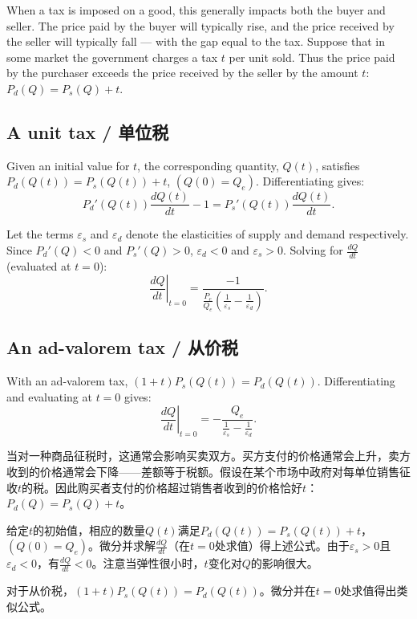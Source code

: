 \begin{original}
When a tax is imposed on a good, this generally impacts both the buyer and seller. The price paid by the buyer will typically rise, and the price received by the seller will typically fall --- with the gap equal to the tax. Suppose that in some market the government charges a tax $t$ per unit sold. Thus the price paid by the purchaser exceeds the price received by the seller by the amount $t$: $P_d(Q) = P_s(Q) + t$.

\subsection{A unit tax / 单位税}

Given an initial value for $t$, the corresponding quantity, $Q(t)$, satisfies $P_d(Q(t)) = P_s(Q(t)) + t$, $(Q(0) = Q_e)$. Differentiating gives:
\[
P_d'(Q(t))\frac{dQ(t)}{dt} - 1 = P_s'(Q(t))\frac{dQ(t)}{dt}.
\]

Let the terms $\varepsilon_s$ and $\varepsilon_d$ denote the elasticities of supply and demand respectively. Since $P_d'(Q) < 0$ and $P_s'(Q) > 0$, $\varepsilon_d < 0$ and $\varepsilon_s > 0$. Solving for $\frac{dQ}{dt}$ (evaluated at $t = 0$):
\[
\left.\frac{dQ}{dt}\right|_{t=0} = \frac{-1}{\frac{P_e}{Q_e}\left(\frac{1}{\varepsilon_s} - \frac{1}{\varepsilon_d}\right)}.
\]

\subsection{An ad-valorem tax / 从价税}

With an ad-valorem tax, $(1 + t)P_s(Q(t)) = P_d(Q(t))$. Differentiating and evaluating at $t = 0$ gives:
\[
\left.\frac{dQ}{dt}\right|_{t=0} = -\frac{Q_e}{\frac{1}{\varepsilon_s} - \frac{1}{\varepsilon_d}}.
\]
\end{original}
\begin{translation}
当对一种商品征税时，这通常会影响买卖双方。买方支付的价格通常会上升，卖方收到的价格通常会下降——差额等于税额。假设在某个市场中政府对每单位销售征收$t$的税。因此购买者支付的价格超过销售者收到的价格恰好$t$：$P_d(Q) = P_s(Q) + t$。

给定$t$的初始值，相应的数量$Q(t)$满足$P_d(Q(t)) = P_s(Q(t)) + t$，$(Q(0) = Q_e)$。微分并求解$\frac{dQ}{dt}$（在$t = 0$处求值）得上述公式。由于$\varepsilon_s > 0$且$\varepsilon_d < 0$，有$\frac{dQ}{dt} < 0$。注意当弹性很小时，$t$变化对$Q$的影响很大。

对于从价税，$(1 + t)P_s(Q(t)) = P_d(Q(t))$。微分并在$t = 0$处求值得出类似公式。
\end{translation}

